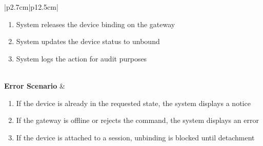 \begin{table}[H]
\begin{tabular}{|p{2.7cm}|p{12.5cm}|}
\begin{minipage}[t]{\linewidth}
\begin{enumerate}[topsep=0pt,itemsep=1pt,parsep=0pt,partopsep=0pt]
                                            \item System releases the device binding on the gateway
                                            \item System updates the device status to unbound
                                            \item System logs the action for audit purposes
                                        \end{enumerate}
                                    \end{minipage} \\
        \hline
        \textbf{Error Scenario} & \begin{minipage}[t]{\linewidth}
                                        \begin{enumerate}[topsep=0pt,itemsep=1pt,parsep=0pt,partopsep=0pt]
                                            \item If the device is already in the requested state, the system displays a notice
                                            \item If the gateway is offline or rejects the command, the system displays an error
                                            \item If the device is attached to a session, unbinding is blocked until detachment
                                        \end{enumerate}
                                    \end{minipage} \\
        \hline
    \end{tabular}
    \label{tab:admin-bind-unbind-device}
\end{table}
